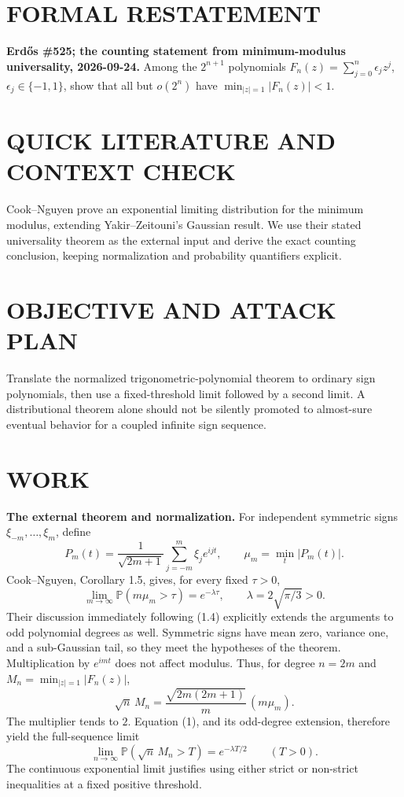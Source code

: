 \section{FORMAL RESTATEMENT}
\textbf{Erd\H{o}s \#525; the counting statement from minimum-modulus universality, 2026-09-24.}
Among the $2^{n+1}$ polynomials $F_n(z)=\sum_{j=0}^n\epsilon_jz^j$, $\epsilon_j\in\{-1,1\}$, show that all but $o(2^n)$ have $\min_{|z|=1}|F_n(z)|<1$.

\section{QUICK LITERATURE AND CONTEXT CHECK}
Cook--Nguyen prove an exponential limiting distribution for the minimum modulus, extending Yakir--Zeitouni's Gaussian result. We use their stated universality theorem as the external input and derive the exact counting conclusion, keeping normalization and probability quantifiers explicit.

\section{OBJECTIVE AND ATTACK PLAN}
Translate the normalized trigonometric-polynomial theorem to ordinary sign polynomials, then use a fixed-threshold limit followed by a second limit. A distributional theorem alone should not be silently promoted to almost-sure eventual behavior for a coupled infinite sign sequence.

\section{WORK}
\textbf{The external theorem and normalization.} For independent symmetric signs $\xi_{-m},\ldots,\xi_m$, define
\[
 P_m(t)=\frac1{\sqrt{2m+1}}\sum_{j=-m}^m\xi_j e^{ijt},
 \qquad \mu_m=\min_t|P_m(t)|.
\]
Cook--Nguyen, Corollary 1.5, gives, for every fixed $\tau>0$,
\[
 \lim_{m\to\infty}\mathbb P(m\mu_m>\tau)=e^{-\lambda\tau},
 \qquad \lambda=2\sqrt{\pi/3}>0.                       \tag{1}
\]
Their discussion immediately following (1.4) explicitly extends the arguments to odd polynomial degrees as well. Symmetric signs have mean zero, variance one, and a sub-Gaussian tail, so they meet the hypotheses of the theorem.
Multiplication by $e^{imt}$ does not affect modulus. Thus, for degree $n=2m$ and $M_n=\min_{|z|=1}|F_n(z)|$,
\[
 \sqrt n\,M_n
 =\frac{\sqrt{2m(2m+1)}}{m}\,(m\mu_m).
\]
The multiplier tends to $2$. Equation (1), and its odd-degree extension, therefore yield the full-sequence limit
\[
 \lim_{n\to\infty}\mathbb P(\sqrt n\,M_n>T)
   =e^{-\lambda T/2}\qquad(T>0).                       \tag{2}
\]
The continuous exponential limit justifies using either strict or non-strict inequalities at a fixed positive threshold.

